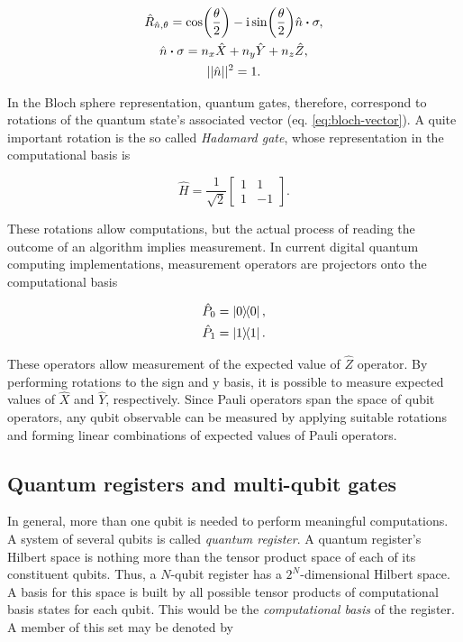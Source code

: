   \begin{gather}
    \hat{R}_{\hat{n}, \theta} = \cos(\frac{\theta}{2}) - \mathrm{i}\sin(\frac{\theta}{2}) \hat{n} \vdot \sigma, \\
    \hat{n} \vdot \sigma = n_x \hat{X} + n_y \hat{Y} + n_z \hat{Z}, \\
    ||\hat{n}||^2 = 1.
  \end{gather}

  In the Bloch sphere representation, quantum gates, therefore, correspond to rotations of the quantum state's associated vector (eq. \ref{eq:bloch-vector}). A quite important rotation is the so called \textit{Hadamard gate}, whose representation in the computational basis is
  
  \begin{equation}
    \hat{H} = \frac{1}{\sqrt{2}}\begin{bmatrix}
      1 & 1 \\
      1 & -1
    \end{bmatrix}.
    \label{eq:hadamard-gate}
  \end{equation}
  
  
  These rotations allow computations, but the actual process of reading the outcome of an algorithm implies measurement. In current digital quantum computing implementations, measurement operators are projectors onto the computational basis

  \begin{gather}
    \hat{P}_0 = \ketbra{0}{0}, \\
    \hat{P}_1 = \ketbra{1}{1}. 
    \label{eq:measurement-ops}
  \end{gather}

  These operators allow measurement of the expected value of $\hat{Z}$ operator. By performing rotations to the sign and y basis, it is possible to measure expected values of $\hat{X}$ and $\hat{Y}$, respectively. Since Pauli operators span the space of qubit operators, any qubit observable can be measured by applying suitable rotations and forming linear combinations of expected values of Pauli operators.

  \subsection{Quantum registers and multi-qubit gates}
  \label{subsec:MultiQubit}

    In general, more than one qubit is needed to perform meaningful computations. A system of several qubits is called \textit{quantum register}. A quantum register's Hilbert space is nothing more than the tensor product space of each of its constituent qubits. Thus, a $N$-qubit register has a $2^N$-dimensional Hilbert space. A basis for this space is built by all possible tensor products of computational basis states for each qubit. This would be the \textit{computational basis} of the register. A member of this set may be denoted by

